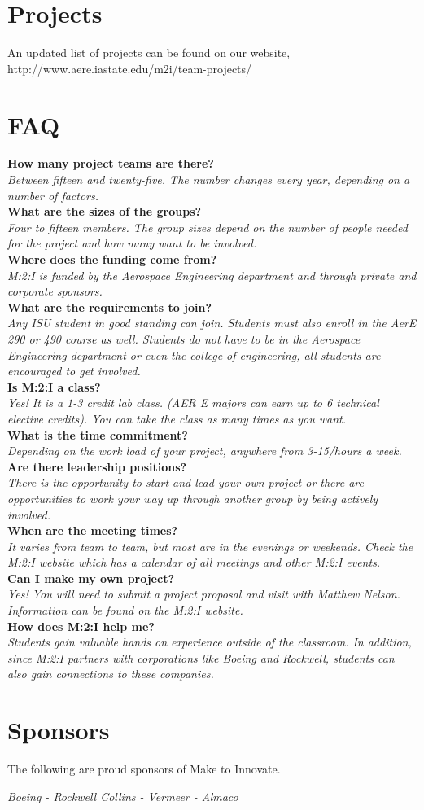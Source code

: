 \documentclass[10pt,foldmark,notumble]{leaflet}
\begin{document}
\section{Projects}
An updated list of projects can be found on our website, http://www.aere.iastate.edu/m2i/team-projects/

\section{FAQ}
\textbf{How many project teams are there?} \ \\
\textit{Between fifteen and twenty-five. The number changes every year, depending on a number of factors.}\ \\ 
\textbf{What are the sizes of the groups?}\ \\
\textit{Four to fifteen members. The group sizes depend on the number of people needed for the project and how many want to be involved.}\ \\
\textbf{Where does the funding come from?}\ \\
\textit{M:2:I is funded by the Aerospace Engineering department and through private and corporate sponsors.}\ \\ 
\textbf{What are the requirements to join?}\ \\
\textit{Any ISU student in good standing can join.  Students must also enroll in the AerE 290 or 490 course as well.  Students do not have to be in the Aerospace Engineering department or even the college of engineering, all students are encouraged to get involved.}\ \\
\textbf{Is M:2:I a class?}\ \\
\textit{Yes! It is a 1-3 credit lab class. (AER E majors can earn up to 6 technical elective credits).  You can take the class as many times as you want.}\ \\
\textbf{What is the time commitment?}\ \\
\textit{Depending on the work load of your project, anywhere from 3-15/hours a week.}\ \\
\textbf{Are there leadership positions?}\ \\
\textit{There is the opportunity to start and lead your own project or there are opportunities to work your way up through another group by being actively involved.}\ \\ 
\textbf{When are the meeting times?}\ \\
\textit{It varies from team to team, but most are in the evenings or weekends. Check the M:2:I website which has a calendar of all meetings and other M:2:I events.}\ \\
\textbf{Can I make my own project?}\ \\
\textit{Yes! You will need to submit a project proposal and visit with Matthew Nelson.  Information can be found on the M:2:I website.}\ \\
\textbf{How does M:2:I help me?}\ \\
\textit{Students gain valuable hands on experience outside of the classroom.  In addition, since M:2:I partners with corporations like Boeing and Rockwell, students can also gain connections to these companies.}
\section{Sponsors}
The following are proud sponsors of Make to Innovate.
\begin{center}
\Large
\emph{Boeing - Rockwell Collins - Vermeer - Almaco}
\end{center}
\end{document}
